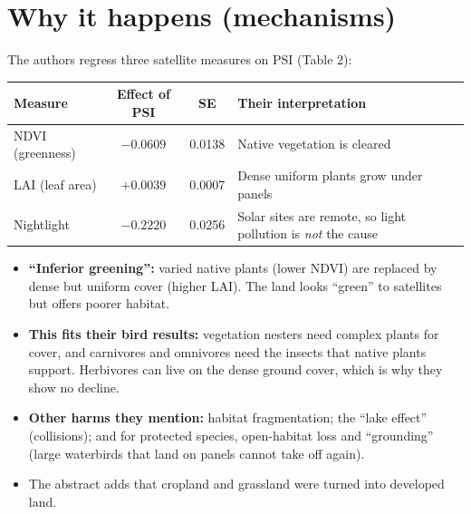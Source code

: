 \documentclass[11pt]{article}
\begin{document}
\section{Why it happens (mechanisms)}
The authors regress three satellite measures on PSI (Table 2):
\begin{table}[H]\centering\small
\begin{tabular}{lccl}
\toprule
Measure & Effect of PSI & SE & Their interpretation\\
\midrule
NDVI (greenness) & $-0.0609$ & 0.0138 & Native vegetation is cleared\\
LAI (leaf area) & $+0.0039$ & 0.0007 & Dense uniform plants grow under panels\\
Nightlight & $-0.2220$ & 0.0256 & Solar sites are remote, so light pollution is \emph{not} the cause\\
\bottomrule
\end{tabular}
\end{table}
\begin{itemize}
\item \textbf{``Inferior greening'':} varied native plants (lower NDVI) are replaced by dense but uniform cover (higher LAI). The land looks ``green'' to satellites but offers poorer habitat.
\item \textbf{This fits their bird results:} vegetation nesters need complex plants for cover, and carnivores and omnivores need the insects that native plants support. Herbivores can live on the dense ground cover, which is why they show no decline.
\item \textbf{Other harms they mention:} habitat fragmentation; the ``lake effect'' (collisions); and for protected species, open-habitat loss and ``grounding'' (large waterbirds that land on panels cannot take off again).
\item The abstract adds that cropland and grassland were turned into developed land.
\end{itemize}

\end{document}
